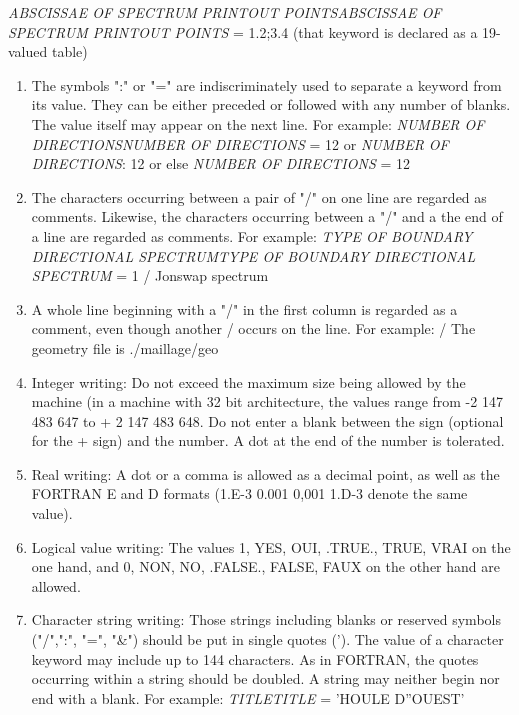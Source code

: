 \textit{ABSCISSAE OF SPECTRUM PRINTOUT POINTSABSCISSAE OF SPECTRUM PRINTOUT POINTS }= 1.2;3.4   (that keyword is declared as a 19-valued table)

\begin{enumerate}
\item  The symbols ":" or "=" are indiscriminately used to separate a keyword from its value. They can be either preceded or followed with any number of blanks. The value itself may appear on the next line. For example:    \textit{NUMBER OF DIRECTIONSNUMBER OF DIRECTIONS} = 12    or    \textit{NUMBER OF DIRECTIONS}: 12   or else   \textit{NUMBER OF DIRECTIONS} =   12

\item  The characters occurring between a pair of "/" on one line are regarded as comments. Likewise, the characters occurring between a "/" and a the end of a line are regarded as comments. For example:  \textit{TYPE OF BOUNDARY DIRECTIONAL SPECTRUMTYPE OF BOUNDARY DIRECTIONAL SPECTRUM }= 1 / Jonswap spectrum

\item  A whole line beginning with a "/" in the first column is regarded as a comment, even though another / occurs on the line. For example:  / The geometry file is ./maillage/geo

\item  Integer writing: Do not exceed the maximum size being allowed by the machine (in a machine with 32 bit architecture, the values range from -2 147 483 647 to + 2 147 483 648. Do not enter a blank between the sign (optional for the + sign) and the number. A dot at the end of the number is tolerated.

\item  Real writing: A dot or a comma is allowed as a decimal point, as well as the FORTRAN E and D formats (1.E-3 0.001 0,001 1.D-3 denote the same value).

\item  Logical value writing: The values 1, YES, OUI, .TRUE., TRUE, VRAI on the one hand, and 0, NON, NO, .FALSE., FALSE, FAUX on the other hand are allowed.

\item  Character string writing: Those strings including blanks or reserved symbols ("/",":", "=", "\&") should be put in single quotes ('). The value of a character keyword may include up to 144 characters. As in FORTRAN, the quotes occurring within a string should be doubled. A string may neither begin nor end with a blank. For example:   \textit{TITLETITLE} = 'HOULE D''OUEST'
\end{enumerate}

